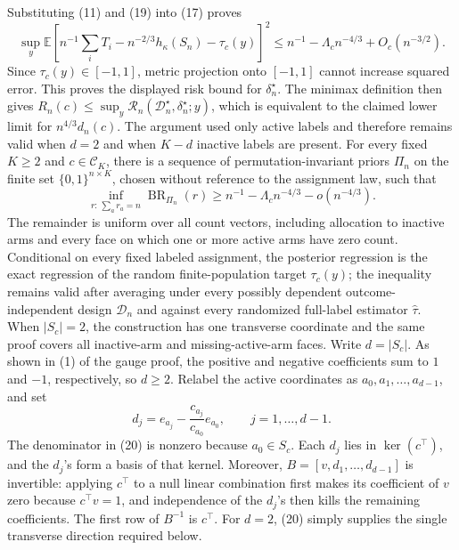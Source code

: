 Substituting (11) and (19) into (17) proves
\[
\sup_y\mathbb E\left[n^{-1}\sum_iT_i-n^{-2/3}h_\kappa(S_n)-\tau_c(y)\right]^2
\le n^{-1}-\Lambda_cn^{-4/3}+O_c(n^{-3/2}).
\]
Since \(\tau_c(y)\in[-1,1]\), metric projection onto \([-1,1]\) cannot increase squared error.  This proves the displayed risk bound for \(\delta_n^\star\).  The minimax definition then gives \(R_n(c)\le\sup_y\mathcal R_n(\mathcal D_n^\star,\delta_n^\star;y)\), which is equivalent to the claimed lower limit for \(n^{4/3}d_n(c)\).  The argument used only active labels and therefore remains valid when \(d=2\) and when \(K-d\) inactive labels are present.
For every fixed \(K\ge2\) and \(c\in\mathcal C_K\), there is a sequence of permutation-invariant priors \(\Pi_n\) on the finite set \(\{0,1\}^{n\times K}\), chosen without reference to the assignment law, such that
\[
\inf_{r:\,\sum_ar_a=n}\operatorname{BR}_{\Pi_n}(r)
\ge n^{-1}-\Lambda_cn^{-4/3}-o(n^{-4/3}).
\]
The remainder is uniform over all count vectors, including allocation to inactive arms and every face on which one or more active arms have zero count.  Conditional on every fixed labeled assignment, the posterior regression is the exact regression of the random finite-population target \(\tau_c(y)\); the inequality remains valid after averaging under every possibly dependent outcome-independent design \(\mathcal D_n\) and against every randomized full-label estimator \(\widehat\tau\).  When \(|S_c|=2\), the construction has one transverse coordinate and the same proof covers all inactive-arm and missing-active-arm faces.
Write \(d=|S_c|\).  As shown in (1) of the gauge proof, the positive and negative coefficients sum to \(1\) and \(-1\), respectively, so \(d\ge2\).  Relabel the active coordinates as \(a_0,a_1,\ldots,a_{d-1}\), and set
\[
d_j=e_{a_j}-\frac{c_{a_j}}{c_{a_0}}e_{a_0},
\qquad j=1,\ldots,d-1.
\tag{20}
\]
The denominator in (20) is nonzero because \(a_0\in S_c\).  Each \(d_j\) lies in \(\ker(c^\top)\), and the \(d_j\)'s form a basis of that kernel.  Moreover, \(B=[v,d_1,\ldots,d_{d-1}]\) is invertible: applying \(c^\top\) to a null linear combination first makes its coefficient of \(v\) zero because \(c^\top v=1\), and independence of the \(d_j\)'s then kills the remaining coefficients.  The first row of \(B^{-1}\) is \(c^\top\).  For \(d=2\), (20) simply supplies the single transverse direction required below.

